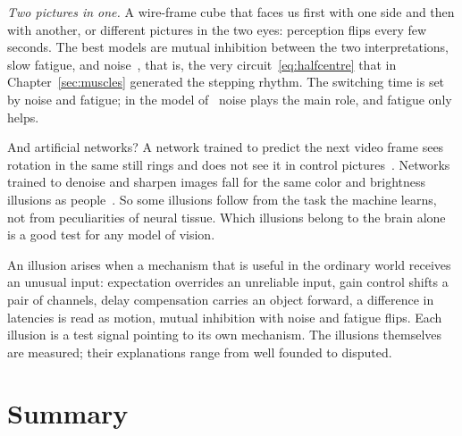 \emph{Two pictures in one.} A wire-frame cube that faces us first with one side and then with another, or different pictures in the two eyes: perception flips every few seconds. The best models are mutual inhibition between the two interpretations, slow fatigue, and noise~\cite{MorenoBote2007}, that is, the very circuit~\eqref{eq:halfcentre} that in Chapter~\ref{sec:muscles} generated the stepping rhythm. The switching time is set by noise and fatigue; in the model of~\cite{MorenoBote2007} noise plays the main role, and fatigue only helps.

And artificial networks? A network trained to predict the next video frame sees rotation in the same still rings and does not see it in control pictures~\cite{Watanabe2018}. Networks trained to denoise and sharpen images fall for the same color and brightness illusions as people~\cite{GomezVilla2020}. So some illusions follow from the task the machine learns, not from peculiarities of neural tissue. Which illusions belong to the brain alone is a good test for any model of vision.

\begin{keyblock}
\begin{proposition}
\label{prop:illusions}
An illusion arises when a mechanism that is useful in the ordinary world receives an unusual input: expectation overrides an unreliable input, gain control shifts a pair of channels, delay compensation carries an object forward, a difference in latencies is read as motion, mutual inhibition with noise and fatigue flips. Each illusion is a test signal pointing to its own mechanism. The illusions themselves are measured; their explanations range from well founded to disputed.
\end{proposition}
\end{keyblock}

\section{Summary}

